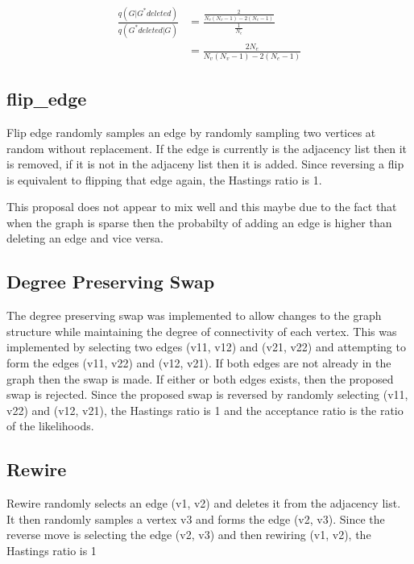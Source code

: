 \documentclass[11pt,a4paper]{article}
\numberwithin{equation}{section}
\begin{document}
\[ \begin{aligned} \frac{q(G|G^* deleted)}{q(G^* deleted|G)} & = \frac{\frac{2}{N_v(N_v-1) - 2(N_e-1)}}{\frac{1}{N_e}} \\ &= \frac{2N_e}{N_v(N_v-1) - 2(N_e-1)} \end{aligned} \]

\hypertarget{flip_edge}{%
\subsection{flip\_edge}\label{flip_edge}}

Flip edge randomly samples an edge by randomly sampling two vertices at
random without replacement. If the edge is currently is the adjacency
list then it is removed, if it is not in the adjaceny list then it is
added. Since reversing a flip is equivalent to flipping that edge again,
the Hastings ratio is 1.

This proposal does not appear to mix well and this maybe due to the fact
that when the graph is sparse then the probabilty of adding an edge is
higher than deleting an edge and vice versa.

\hypertarget{degree-preserving-swap}{%
\subsection{Degree Preserving Swap}\label{degree-preserving-swap}}

The degree preserving swap was implemented to allow changes to the graph
structure while maintaining the degree of connectivity of each vertex.
This was implemented by selecting two edges (v11, v12) and (v21, v22)
and attempting to form the edges (v11, v22) and (v12, v21). If both
edges are not already in the graph then the swap is made. If either or
both edges exists, then the proposed swap is rejected. Since the
proposed swap is reversed by randomly selecting (v11, v22) and (v12,
v21), the Hastings ratio is 1 and the acceptance ratio is the ratio of
the likelihoods.

\hypertarget{rewire}{%
\subsection{Rewire}\label{rewire}}

Rewire randomly selects an edge (v1, v2) and deletes it from the
adjacency list. It then randomly samples a vertex v3 and forms the edge
(v2, v3). Since the reverse move is selecting the edge (v2, v3) and then
rewiring (v1, v2), the Hastings ratio is 1
\end{document}
